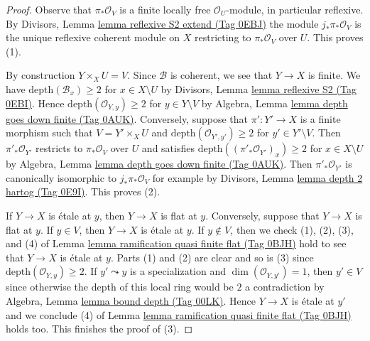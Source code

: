 \documentclass{amsart}
\theoremstyle{plain}
\theoremstyle{definition}
\theoremstyle{remark}
\numberwithin{equation}{subsection}
\begin{document}
\begin{proof}
Observe that $\pi_*\mathcal{O}_V$ is a finite locally free
$\mathcal{O}_U$-module, in particular reflexive.
By Divisors, Lemma \href{https://stacks.math.columbia.edu/tag/0EBJ}{lemma reflexive S2 extend (Tag 0EBJ)}
the module $j_*\pi_*\mathcal{O}_V$ is the unique
reflexive coherent module on $X$ restricting to
$\pi_*\mathcal{O}_V$ over $U$. This proves (1).

\medskip\noindent
By construction $Y \times_X U = V$.
Since $\mathcal{B}$ is coherent, we see that $Y \to X$ is finite.
We have $\text{depth}(\mathcal{B}_x) \geq 2$ for $x \in X \setminus U$
by Divisors, Lemma \href{https://stacks.math.columbia.edu/tag/0EBI}{lemma reflexive S2 (Tag 0EBI)}.
Hence $\text{depth}(\mathcal{O}_{Y, y}) \geq 2$ for $y \in Y \setminus V$
by Algebra, Lemma \href{https://stacks.math.columbia.edu/tag/0AUK}{lemma depth goes down finite (Tag 0AUK)}.
Conversely, suppose that $\pi' : Y' \to X$ is a finite morphism such that
$V = Y' \times_X U$ and $\text{depth}(\mathcal{O}_{Y', y'}) \geq 2$
for $y' \in Y' \setminus V$. Then $\pi'_*\mathcal{O}_{Y'}$
restricts to $\pi_*\mathcal{O}_V$ over $U$ and satisfies
$\text{depth}((\pi'_*\mathcal{O}_{Y'})_x) \geq 2$ for
$x \in X \setminus U$ by
Algebra, Lemma \href{https://stacks.math.columbia.edu/tag/0AUK}{lemma depth goes down finite (Tag 0AUK)}.
Then $\pi'_*\mathcal{O}_{Y'}$ is canonically isomorphic
to $j_*\pi_*\mathcal{O}_V$ for example by
Divisors, Lemma \href{https://stacks.math.columbia.edu/tag/0E9I}{lemma depth 2 hartog (Tag 0E9I)}.
This proves (2).

\medskip\noindent
If $Y \to X$ is \'etale at $y$, then $Y \to X$ is flat at $y$.
Conversely, suppose that $Y \to X$ is flat at $y$.
If $y \in V$, then $Y \to X$ is \'etale at $y$.
If $y \not \in V$, then we check (1), (2), (3), and (4) of
Lemma \href{https://stacks.math.columbia.edu/tag/0BJH}{lemma ramification quasi finite flat (Tag 0BJH)} hold
to see that $Y \to X$ is \'etale at $y$. Parts (1) and (2)
are clear and so is (3) since $\text{depth}(\mathcal{O}_{Y, y}) \geq 2$.
If $y' \leadsto y$ is a specialization and $\dim(\mathcal{O}_{Y, y'}) = 1$,
then $y' \in V$ since otherwise the depth of this local ring
would be $2$ a contradiction by
Algebra, Lemma \href{https://stacks.math.columbia.edu/tag/00LK}{lemma bound depth (Tag 00LK)}.
Hence $Y \to X$ is \'etale at $y'$ and we conclude (4) of
Lemma \href{https://stacks.math.columbia.edu/tag/0BJH}{lemma ramification quasi finite flat (Tag 0BJH)} holds too.
This finishes the proof of (3).


\end{proof}
\end{document}
